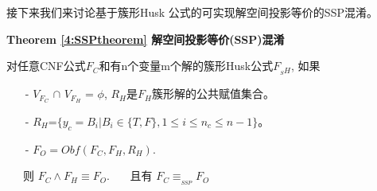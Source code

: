 %
%
接下来我们来讨论基于簇形Husk 公式的可实现解空间投影等价的SSP混淆。

\textbf{Theorem \ref{4:SSPtheorem} 解空间投影等价(SSP)混淆}

对任意CNF公式$F_C$和有n个变量m个解的簇形Husk公式$F_{_SH}$, 如果
\begin{enumerate}
 \item[-] $V_{F_C}$ $\cap$ $V_{F_H}$ = $\phi$, $R_H$是$F_H$簇形解的公共赋值集合。
 \item[-] $R_H$=$\{y_c=B_i| B_i \in \{T,F\}, 1\leqslant i\leqslant n_c \leqslant n-1 \}$。
 \item[-] $F_O=Obf(F_C,F_H,R_H)$.
\end{enumerate}
~~~则 $F_C\wedge F_H \equiv F_O$.
~~~且有 $F_C \equiv_{_{SSP}} F_O$

